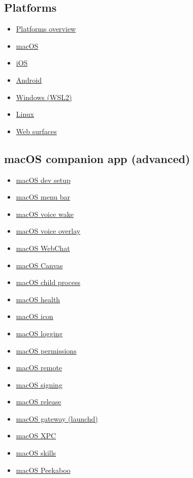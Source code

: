 \subsection{Platforms}


\begin{itemize}
  \item \href{/platforms}{Platforms overview}
  \item \href{/platforms/macos}{macOS}
  \item \href{/platforms/ios}{iOS}
  \item \href{/platforms/android}{Android}
  \item \href{/platforms/windows}{Windows (WSL2)}
  \item \href{/platforms/linux}{Linux}
  \item \href{/web}{Web surfaces}
\end{itemize}


\subsection{macOS companion app (advanced)}


\begin{itemize}
  \item \href{/platforms/mac/dev-setup}{macOS dev setup}
  \item \href{/platforms/mac/menu-bar}{macOS menu bar}
  \item \href{/platforms/mac/voicewake}{macOS voice wake}
  \item \href{/platforms/mac/voice-overlay}{macOS voice overlay}
  \item \href{/platforms/mac/webchat}{macOS WebChat}
  \item \href{/platforms/mac/canvas}{macOS Canvas}
  \item \href{/platforms/mac/child-process}{macOS child process}
  \item \href{/platforms/mac/health}{macOS health}
  \item \href{/platforms/mac/icon}{macOS icon}
  \item \href{/platforms/mac/logging}{macOS logging}
  \item \href{/platforms/mac/permissions}{macOS permissions}
  \item \href{/platforms/mac/remote}{macOS remote}
  \item \href{/platforms/mac/signing}{macOS signing}
  \item \href{/platforms/mac/release}{macOS release}
  \item \href{/platforms/mac/bundled-gateway}{macOS gateway (launchd)}
  \item \href{/platforms/mac/xpc}{macOS XPC}
  \item \href{/platforms/mac/skills}{macOS skills}
  \item \href{/platforms/mac/peekaboo}{macOS Peekaboo}
\end{itemize}


